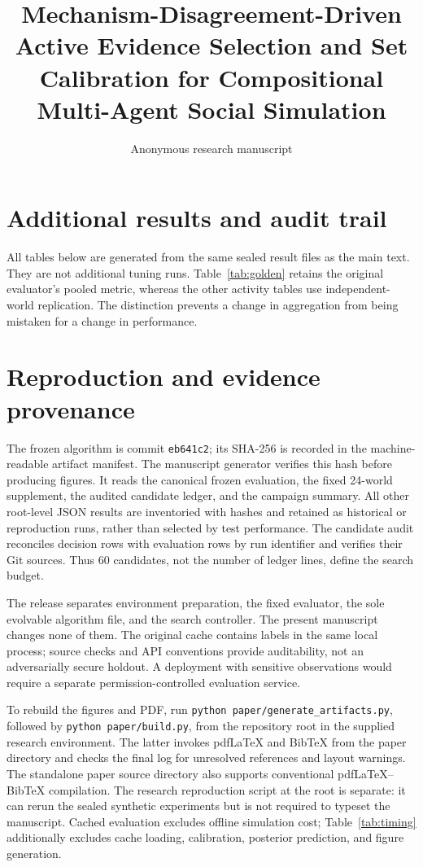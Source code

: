\documentclass[10pt]{article}
\title{Mechanism-Disagreement-Driven Active Evidence Selection and Set Calibration for Compositional Multi-Agent Social Simulation}
\author{Anonymous research manuscript}
\date{}
\begin{document}
\maketitle








\clearpage
\appendix
\section{Additional results and audit trail}
\label{app:results}
All tables below are generated from the same sealed result files as the main text. They are not additional tuning runs. Table~\ref{tab:golden} retains the original evaluator's pooled metric, whereas the other activity tables use independent-world replication. The distinction prevents a change in aggregation from being mistaken for a change in performance.





\FloatBarrier
\section{Reproduction and evidence provenance}
\label{app:reproduction}
The frozen algorithm is commit \texttt{eb641c2}; its SHA-256 is recorded in the machine-readable artifact manifest. The manuscript generator verifies this hash before producing figures. It reads the canonical frozen evaluation, the fixed 24-world supplement, the audited candidate ledger, and the campaign summary. All other root-level JSON results are inventoried with hashes and retained as historical or reproduction runs, rather than selected by test performance. The candidate audit reconciles decision rows with evaluation rows by run identifier and verifies their Git sources. Thus 60 candidates, not the number of ledger lines, define the search budget.

The release separates environment preparation, the fixed evaluator, the sole evolvable algorithm file, and the search controller. The present manuscript changes none of them. The original cache contains labels in the same local process; source checks and API conventions provide auditability, not an adversarially secure holdout. A deployment with sensitive observations would require a separate permission-controlled evaluation service.

To rebuild the figures and PDF, run \texttt{python paper/generate\_artifacts.py}, followed by \texttt{python paper/build.py}, from the repository root in the supplied research environment. The latter invokes pdfLaTeX and BibTeX from the paper directory and checks the final log for unresolved references and layout warnings. The standalone paper source directory also supports conventional pdfLaTeX--BibTeX compilation. The research reproduction script at the root is separate: it can rerun the sealed synthetic experiments but is not required to typeset the manuscript. Cached evaluation excludes offline simulation cost; Table~\ref{tab:timing} additionally excludes cache loading, calibration, posterior prediction, and figure generation.
\end{document}
